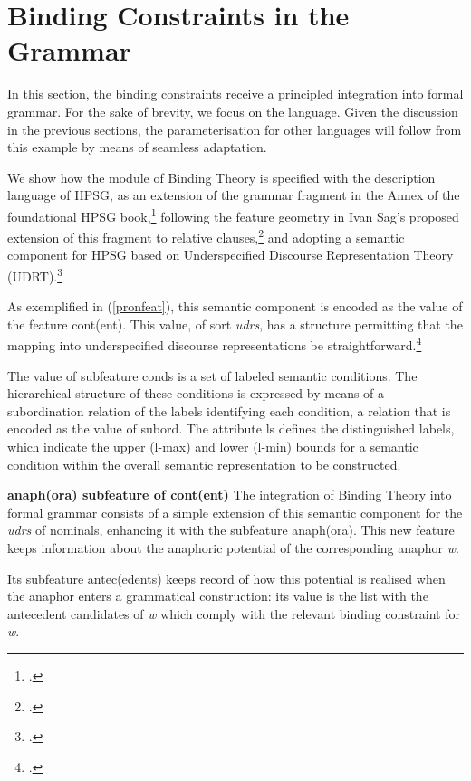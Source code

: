 \documentclass[output=paper
,modfonts
,nonflat]{langsci/langscibook}
\begin{document}
\section{Binding Constraints in the Grammar\label{spec1}}

In this section, the binding constraints receive
a principled integration into formal grammar. 
For the sake of brevity, 
we focus on the  language. Given the discussion in the previous sections,
the parameterisation for other languages will follow from this example by means of seamless adaptation.

We show how the module of Binding Theory is specified 
with the description language of HPSG,
as an extension of the grammar fragment in the Annex of the foundational
HPSG book,\footnote{
\citep[Annex]{polsag:hpsg94}.}
following the feature geometry in Ivan Sag's proposed extension of this fragment to relative clauses,\footnote{
\citep{Sag97a}.} and adopting a semantic component 
for HPSG based on Underspecified Discourse Representation Theory (UDRT).\footnote{
\citep{frank:sem95}.}

As exemplified in (\ref{pronfeat}), this semantic component is encoded as the value of the 
feature {\sc cont(ent)}. This value, of sort {\em udrs}, has a structure permitting that the mapping 
into underspecified discourse representations be straightforward.\footnote{
\citep{reyle:udrt93}.}


The value of subfeature {\sc conds} is a set of labeled
semantic conditions. The hierarchical structure of
these conditions is expressed by means of a subordination relation
of the labels identifying each condition, a relation that
is encoded as the value of {\sc subord}. The attribute {\sc ls} defines
the distinguished labels, which indicate the upper ({\sc l-max}) and
lower ({\sc l-min}) bounds for a semantic condition within the overall semantic
representation to be constructed.

\textbf{{\sc anaph(ora)} subfeature of {\sc cont(ent)}} The integration of Binding Theory 
into formal grammar consists of a simple extension 
of this semantic component for the {\em udrs} of nominals,
enhancing it with the subfeature {\sc anaph(ora)}. This new feature keeps information 
about the anaphoric potential of the corresponding anaphor {\it w}.

Its subfeature {\sc antec(edents)} keeps record of how this potential 
is realised when the anaphor enters a grammatical construction: 
its value is the list with the antecedent candidates of {\it w} which 
comply with the relevant binding constraint for {\it w}. 
\end{document}
